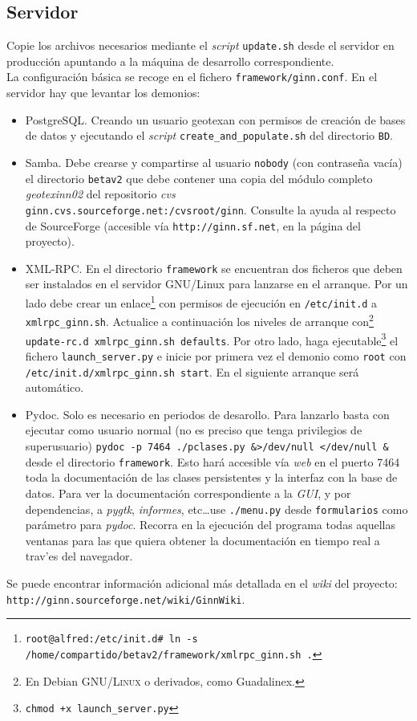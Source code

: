 \documentclass[a4paper]{article}
\newcommand{\marginalnote}[1]{\mbox{}\marginpar{\raggedright\hspace{0pt}#1}}
\newcommand{\iconomargen}[2]{%
  \marginalnote{%
    \parbox[t][\baselineskip * (#1-1)][b]{\marginparwidth}{%
      \texttt{[image: \#2]}%
    }
  }
}
\begin{document}
        \subsection{Servidor}
            Copie los archivos necesarios mediante el \emph{script} \texttt{update.sh} desde el servidor en producción apuntando a la máquina de desarrollo correspondiente.\\
            La configuración básica se recoge en el fichero \texttt{framework/ginn.conf}.
            En el servidor hay que levantar los demonios:
            \begin{itemize}
                \item PostgreSQL. Creando un usuario geotexan con permisos de creación de bases de datos y ejecutando el \emph{script} \texttt{create\_and\_populate.sh} del directorio \texttt{BD}.
                \item Samba. Debe crearse y compartirse al usuario \texttt{nobody} (con contraseña vacía) el directorio \texttt{betav2} que debe contener una copia del módulo completo \emph{geotexinn02} del repositorio \emph{cvs} \\ \texttt{ginn.cvs.sourceforge.net:/cvsroot/ginn}. Consulte la ayuda al respecto de SourceForge (accesible vía \texttt{http://ginn.sf.net}, en la página del proyecto).
\iconomargen{3}{link}
                \item XML-RPC. En el directorio \texttt{framework} se encuentran dos ficheros que deben ser instalados en el servidor GNU/Linux para lanzarse en el arranque. Por un lado debe crear un enlace\footnote{\texttt{root@alfred:/etc/init.d\# ln -s /home/compartido/betav2/framework/xmlrpc\_ginn.sh .}} con permisos de ejecución en \texttt{/etc/init.d} a \texttt{xmlrpc\_ginn.sh}. Actualice a continuación los niveles de arranque con\footnote{En Debian \textsc{GNU/Linux} o derivados, como Guadalinex.} \texttt{update-rc.d xmlrpc\_ginn.sh defaults}. Por otro lado, haga ejecutable\footnote{\texttt{chmod +x launch\_server.py}} el fichero \texttt{launch\_server.py} e inicie por primera vez el demonio como \texttt{root} con \texttt{/etc/init.d/xmlrpc\_ginn.sh start}. En el siguiente arranque será automático.
                \item Pydoc. Solo es necesario en periodos de desarollo. Para lanzarlo basta con ejecutar como usuario normal (no es preciso que tenga privilegios de superusuario) \texttt{pydoc -p 7464 ./pclases.py \&>/dev/null </dev/null \&} desde el directorio \texttt{framework}. Esto hará accesible vía \emph{web} en el puerto 7464 toda la documentación de las clases persistentes y la interfaz con la base de datos. Para ver la documentación correspondiente a la \emph{GUI}, y por dependencias, a \emph{pygtk}, \emph{informes}, etc\dots use \texttt{./menu.py} desde \texttt{formularios} como parámetro para \emph{pydoc}. Recorra en la ejecución del programa todas aquellas ventanas para las que quiera obtener la documentación en tiempo real a trav'es del navegador.
            \end{itemize}
\iconomargen{3}{link}
        Se puede encontrar información adicional más detallada en el \emph{wiki} del proyecto:\\ \texttt{http://ginn.sourceforge.net/wiki/GinnWiki}.\\
\end{document}
